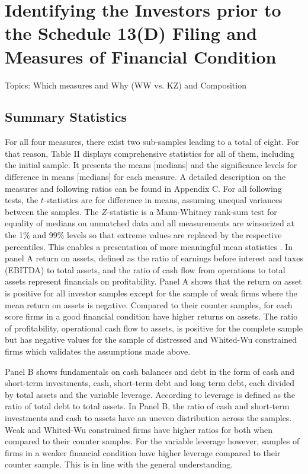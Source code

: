 \documentclass[12pt]{article}
\begin{document}
\section{Identifying the Investors prior to the Schedule 13(D) Filing and Measures of Financial Condition}

Topics: Which measures and Why (WW vs. KZ) and Composition


\subsection{Summary Statistics}
For all four measures, there exist two sub-samples leading to a total of eight. For that reason, Table II displays comprehensive statistics for all of them, including the initial sample. It presents the means [medians] and the significance levels for difference in means [medians] for each measure.
A detailed description on the measures and following ratios can be found in Appendix C. 
For all following tests, the $t$-statistics are for difference in means, assuming unequal variances between the samples. The $Z$-statistic is a Mann-Whitney rank-sum test for equality of medians on unmatched data and all measurements are winsorized at the 1\% and 99\% levels so that extreme values are replaced by the respective percentiles. This enables a presentation of more meaningful mean statistics \citep[p.203]{Klein2009}.
In panel A return on assets, defined as the ratio of earnings before interest and taxes (EBITDA) to total assets, and the ratio of cash flow from operations to total assets represent financials on profitability. Panel A shows that the return on asset is positive for all investor samples except for the sample of weak firms where the mean return on assets is negative. Compared to their counter samples, for each score firms in a good financial condition have higher returns on assets. The ratio of profitability, operational cash flow to assets, is positive for the complete sample but has negative values for the sample of distressed and Whited-Wu constrained firms which validates the assumptions made above.

Panel B shows fundamentals on cash balances and debt in the form of cash and short-term investments, cash, short-term debt and long term debt, each divided by total assets and the variable leverage. According to \citep{MacKay2005} leverage is defined as the ratio of total debt to total assets. 
In Panel B, the ratio of cash and short-term investments and cash to assets have an uneven distribution across the samples. Weak and Whited-Wu constrained firms have higher ratios for both when compared to their counter samples. For the variable leverage however, samples of firms in a weaker financial condition have higher leverage compared to their counter sample. This is in line with the general understanding.
\end{document}
